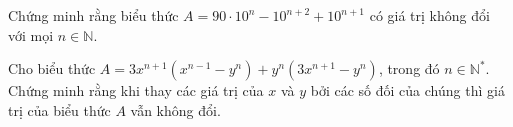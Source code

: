 \begin{vn}
	Chứng minh rằng biểu thức $ A=90\cdot 10^{n}-10^{n+2}+10^{n+1} $ có giá trị không đổi với mọi $ n\in\mathbb{N} $.
\end{vn}
\begin{vn}
Cho biểu thức $ A=3x^{n+1}(x^{n-1}-y^{n})+y^{n}(3x^{n+1}-y^{n}) $, trong đó $ n\in\mathbb{N}^{*} $. Chứng minh rằng khi thay các giá trị của $ x $ và $ y $ bởi các số đối của chúng thì giá trị của biểu thức $ A $ vẫn không đổi.
\end{vn}
